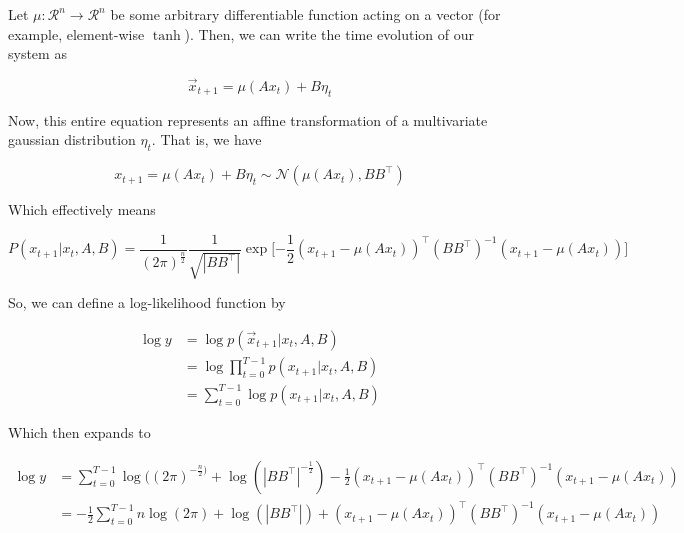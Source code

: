 \documentclass{article}
\theoremstyle{definition}
\begin{document}
Let $\mu: \mathcal{R}^n \longrightarrow \mathcal{R}^n$ be some arbitrary differentiable function acting on a vector (for example, element-wise $\tanh$). Then, we can write the time evolution of our system as

\begin{equation}
    \label{eqn:stateEvolution}
    \Vec{x}_{t+1} = \mu(Ax_t) + B\eta_t
\end{equation}


Now, this entire equation represents an affine transformation of a multivariate gaussian distribution $\eta_t$. That is, we have

\begin{equation}
    x_{t+1} = \mu(Ax_t) + B \eta_t \sim \mathcal{N}(\mu(Ax_t), BB^\top)
\end{equation}

Which effectively means 

\begin{equation}
    P(x_{t+1} | x_t, A, B) = \frac{1}{(2\pi)^{\frac{n}{2}}} \frac{1}{\sqrt{|BB^\top|}} \exp \big[{- \frac{1}{2}} (x_{t+1} - \mu(Ax_t))^\top (BB^\top)^{-1} (x_{t+1} - \mu(Ax_t)) \big]
\end{equation}

So, we can define a log-likelihood function by

\begin{equation}
\begin{split}
    \log y & = \log p(\Vec{x}_{t+1} | x_t, A, B) \\ 
    & = \log \prod_{t=0}^{T - 1} p(x_{t+1} | x_t, A, B) \\ 
    & = \sum_{t=0}^{T - 1} \log p(x_{t+1} | x_t, A, B)
\end{split}
\end{equation}

Which then expands to 

\begin{equation}
\label{eqn:likelihoodFunction}
\begin{split}
    \log y &= \sum_{t=0}^{T - 1} \log((2\pi)^{-\frac{n}{2})} + \log(|BB^\top|^{-\frac{1}{2}}) - \frac{1}{2}(x_{t+1} - \mu(Ax_t))^\top (BB^\top)^{-1} (x_{t+1} - \mu(Ax_t)) \\ 
    &= - \frac{1}{2} \sum_{t=0}^{T - 1} n \log(2\pi) + \log(|BB^\top|) + (x_{t+1} - \mu(Ax_t))^\top (BB^\top)^{-1} (x_{t+1} - \mu(Ax_t))
\end{split}
\end{equation}
\end{document}
